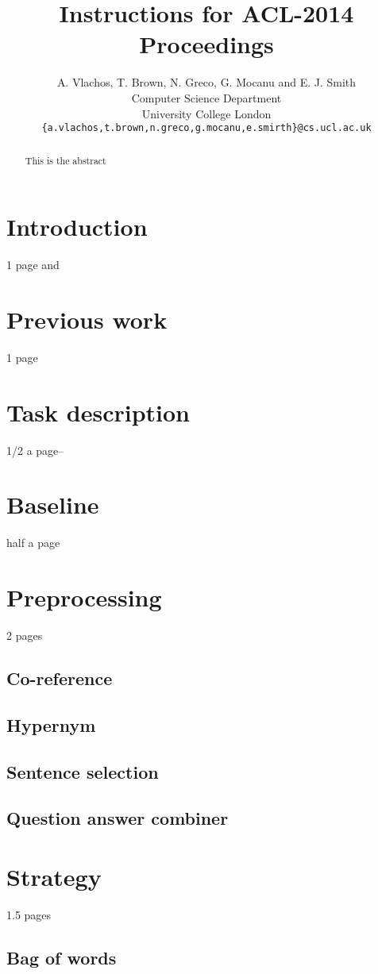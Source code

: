 \documentclass[11pt]{article}
\title{Instructions for ACL-2014 Proceedings}
\author
       {A. Vlachos, T. Brown, N. Greco, G. Mocanu and E. J. Smith
       \\
       Computer Science Department\\
	University College London\\
       \tt{\{a.vlachos,t.brown,n.greco,g.mocanu,e.smirth\}@cs.ucl.ac.uk}\\ 
       }
\date{}
\begin{document}
\maketitle
\begin{abstract}
  This is the abstract
\end{abstract}

\section{Introduction}
1 page \cite{mctest} and 

\section{Previous work}
1 page

\section{Task description}
1/2 a page--

\section{Baseline}
half a page
\section{Preprocessing}
2 pages
\subsection{Co-reference}
\subsection{Hypernym}
\subsection{Sentence selection}
\subsection{Question answer combiner}

\section{Strategy}
1.5 pages
\subsection{Bag of words}
\end{document}
